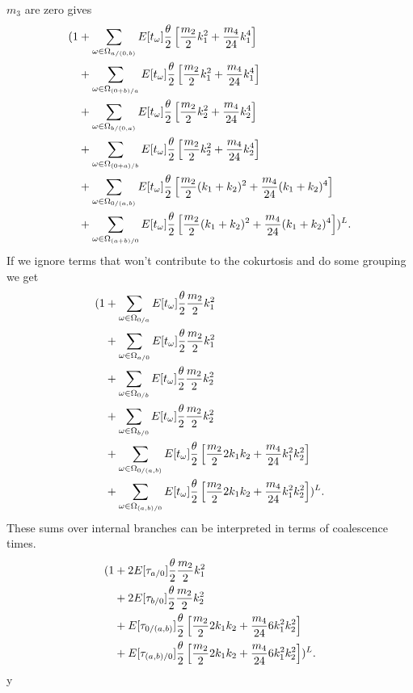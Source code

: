 $m_3$ are zero gives
\begin{align*}
  (1 &+ \sum_{\omega \in \Omega_{a/(0,b)}} E[t_\omega] \frac{\theta}{2} 
       \left[ \frac{m_2}{2} k_1^2 + \frac{m_4}{24}k_1^4\right] \\
     &+ \sum_{\omega \in \Omega_{(0+b)/a}} E[t_\omega] \frac{\theta}{2} 
       \left[ \frac{m_2}{2} k_1^2 + \frac{m_4}{24}k_1^4 \right] \\
     &+ \sum_{\omega \in \Omega_{b/(0,a)}} E[t_\omega] \frac{\theta}{2}
       \left[ \frac{m_2}{2} k_2^2 + \frac{m_4}{24}k_2^4 \right] \\
     &+ \sum_{\omega \in \Omega_{(0+a)/b}} E[t_\omega] \frac{\theta}{2} 
       \left[ \frac{m_2}{2} k_2^2 + \frac{m_4}{24}k_2^4 \right] \\
     &+ \sum_{\omega \in \Omega_{0/(a,b)}} E[t_\omega] \frac{\theta}{2}
       \left[ \frac{m_2}{2} (k_1 + k_2)^2 + \frac{m_4}{24}(k_1 + k_2)^4\right] \\
     &+ \sum_{\omega \in \Omega_{(a+b)/0}} E[t_\omega] \frac{\theta}{2} 
       \left[ \frac{m_2}{2} (k_1 + k_2)^2 + \frac{m_4}{24}(k_1 + k_2)^4 \right])^L.
\end{align*}
If we ignore terms that won't contribute to the cokurtosis and do some grouping
we get
\begin{align*}
  (1 &+ \sum_{\omega \in \Omega_{0/a}} E[t_\omega] \frac{\theta}{2} \frac{m_2}{2}k_1^2 \\
     &+ \sum_{\omega \in \Omega_{a/0}} E[t_\omega] \frac{\theta}{2} \frac{m_2}{2}k_1^2 \\
     &+ \sum_{\omega \in \Omega_{0/b}} E[t_\omega] \frac{\theta}{2} \frac{m_2}{2}k_2^2 \\
     &+ \sum_{\omega \in \Omega_{b/0}} E[t_\omega] \frac{\theta}{2} \frac{m_2}{2}k_2^2 \\
     &+ \sum_{\omega \in \Omega_{0/(a,b)}} E[t_\omega] \frac{\theta}{2} 
       \left[ \frac{m_2}{2} 2k_1k_2 + \frac{m_4}{24}k_1^2k_2^2\right]\\
     &+ \sum_{\omega \in \Omega_{(a,b)/0}} E[t_\omega] \frac{\theta}{2} 
       \left[ \frac{m_2}{2} 2k_1k_2 + \frac{m_4}{24}k_1^2k_2^2\right])^L.
\end{align*}
These sums over internal branches can be interpreted in terms of coalescence
times. 
\begin{align*}
(1 &+ 2E[\tau_{a/0}] \frac{\theta}{2} \frac{m_2}{2}k_1^2 \\
   &+ 2E[\tau_{b/0}] \frac{\theta}{2} \frac{m_2}{2}k_2^2 \\
   &+ E[\tau_{0/(a,b)}] \frac{\theta}{2} \left[ \frac{m_2}{2} 2k_1k_2 + \frac{m_4}{24}6k_1^2k_2^2\right]\\
   &+ E[\tau_{(a,b)/0}] \frac{\theta}{2} \left[ \frac{m_2}{2} 2k_1k_2 + \frac{m_4}{24}6k_1^2k_2^2\right])^L.
\end{align*}y
